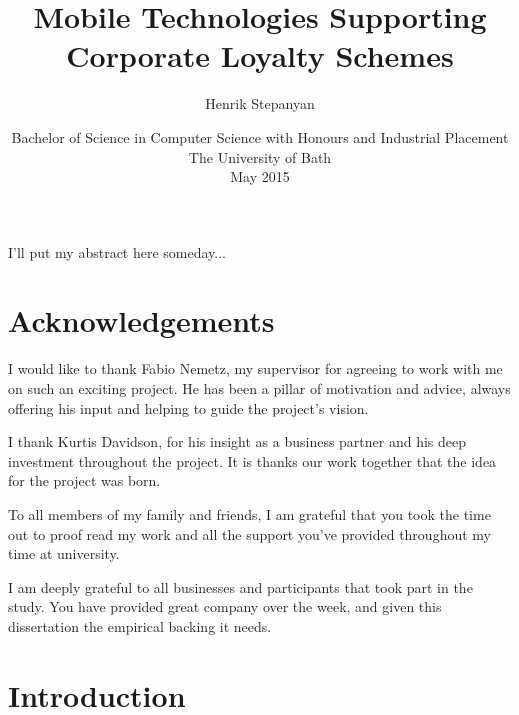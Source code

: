 \documentclass[11pt,openright,a4paper]{report}
\title{Mobile Technologies Supporting Corporate Loyalty Schemes}
\author{Henrik Stepanyan}
\date{Bachelor of Science in Computer Science with Honours and Industrial
Placement\\The University of Bath\\May 2015}
\begin{document}
\lstset{language=Java,breaklines,breakatwhitespace,basicstyle=\small}


\setcounter{page}{0}


\maketitle
\newpage


\newpage


\newpage


\abstract
I'll put my abstract here someday...
\newpage


\tableofcontents
\listoffigures
\listoftables
\newpage

\chapter*{Acknowledgements}
I would like to thank Fabio Nemetz, my supervisor for agreeing to work with me
on such an exciting project. He has been a pillar of motivation and advice,
always offering his input and helping to guide the project's vision.

I thank Kurtis Davidson, for his insight as a business partner and his deep
investment throughout the project. It is thanks our work together that the idea
for the project was born.

To all members of my family and friends, I am grateful that you took the time 
out to proof read my work and all the support you've provided throughout
my time at university.

I am deeply grateful to all businesses and participants that took part in
the study. You have provided great company over the week, and given this
dissertation the empirical backing it needs.

\newpage


\setcounter{page}{1}



\chapter{Introduction}

\end{document}
